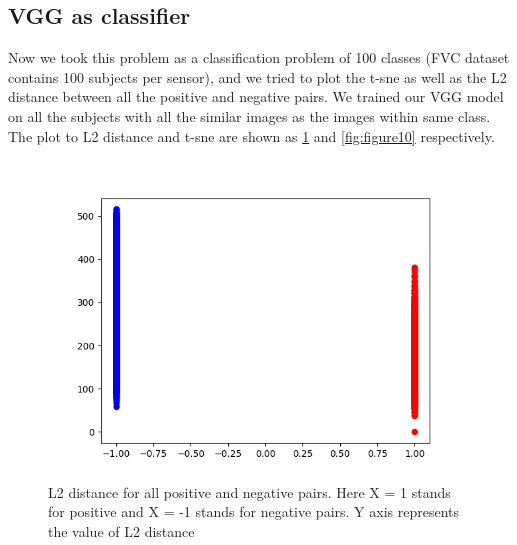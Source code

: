 \subsection{VGG as classifier}
Now we took this problem as a classification problem of 100 classes (FVC dataset contains 100 subjects per sensor), and we tried to plot the t-sne \cite{Maaten2008VisualizingDU} as well as the L2 distance between all the positive and negative pairs. We trained our VGG model on all the subjects with all the similar images as the images within same class. The plot to L2 distance and t-sne \cite{Maaten2008VisualizingDU} are shown as \ref{fig:figure9} and \ref{fig:figure10} respectively.

\begin{figure}[htbp]
\centering
\includegraphics[scale=1]{./Chapter4/Figures/CLSnorms_pos_neg_1}
\caption{L2 distance for all positive and negative pairs. Here X = 1 stands for positive and X = -1 stands for negative pairs. Y axis represents the value of L2 distance}
\label{fig:figure9}
\end{figure}

